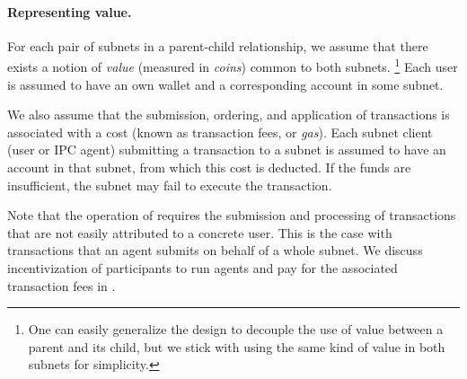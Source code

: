 \paragraph{Representing value.}
For each pair of subnets in a parent-child relationship, we assume that there exists a notion of \emph{value} (measured in \emph{coins}) common to both subnets.%
\footnote{One can easily generalize the design to decouple the use of value between a parent and its child, but we stick with using the same kind of value in both subnets for simplicity.}
Each user is assumed to have an own wallet and a corresponding account in some subnet.

We also assume that the submission, ordering, and application of transactions is associated with a cost (known as transaction fees, or \emph{gas}).
Each subnet client (user or IPC agent)  submitting a transaction to a subnet is assumed to have an account in that subnet, from which this cost is deducted.
If the funds are insufficient, the subnet may fail to execute the transaction.

Note that the operation of \ipc requires the submission and processing of transactions that are not easily attributed to a concrete user.
This is the case with transactions that an \ipc agent submits on behalf of a whole subnet.
We discuss incentivization of participants to run \ipc agents and pay for the associated transaction fees in .

